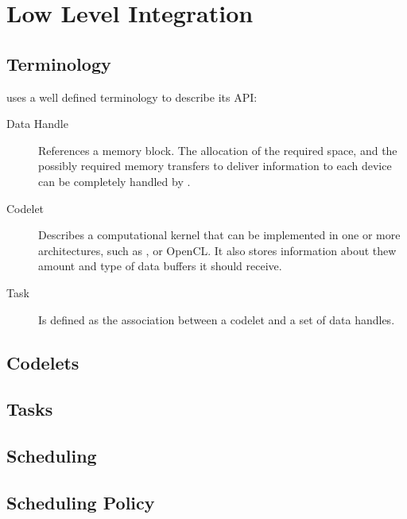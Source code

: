 \documentclass[main.tex]{subfiles}
\begin{document}
\section{Low Level Integration}

\subsection{Terminology}

\starpu uses a well defined terminology to describe its API:

\begin{description}
  \item[Data Handle] References a memory block. The allocation of the required space, and the possibly required memory transfers to deliver information to each device can be completely handled by \starpu.

  \item[Codelet] Describes a computational kernel that can be implemented in one or more architectures, such as \cpus, \cuda or \acs{OpenCL}. It also stores information about thew amount and type of data buffers it should receive.

  \item[Task] Is defined as the association between a codelet and a set of data handles.
\end{description}

\subsection{Codelets}

\subsection{Tasks}

\subsection{Scheduling}

\subsection{Scheduling Policy}
\end{document}
